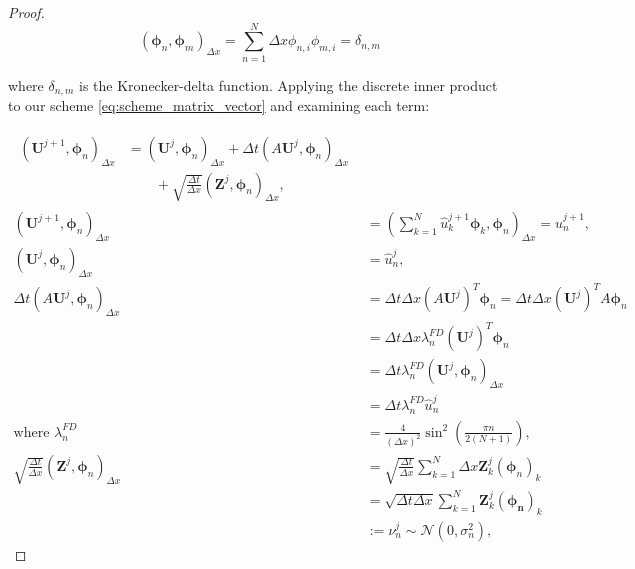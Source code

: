 \begin{proof}
\begin{equation*}
    (\boldsymbol{\phi}_n, \boldsymbol{\phi}_m)_{\Delta x} 
    = \sum_{n=1}^N \Delta x \phi_{n,i} \phi_{m,i} = \delta_{n,m}
\end{equation*}

where $\delta_{n,m}$ is the Kronecker-delta function.
Applying the discrete inner product to our 
scheme \eqref{eq:scheme_matrix_vector} and examining each term:

\begin{align}
    \begin{split}
        (\mathbf{U}^{j+1}, \boldsymbol{\phi}_n)_{\Delta x} &= 
        (\mathbf{U}^j, \boldsymbol{\phi}_n)_{\Delta x} + 
        \Delta t (A \mathbf{U}^j, \boldsymbol{\phi}_n)_{\Delta x}
        \label{eq:inner_product_var_res}
        \\
        &\qquad + \sqrt{\frac{\Delta t}{\Delta x}} 
        (\mathbf{Z}^j, \boldsymbol{\phi}_n)_{\Delta x},
    \end{split}\\
    (\mathbf{U}^{j+1}, \boldsymbol{\phi}_n)_{\Delta x} &=
    \left(\sum_{k=1}^{N} \hat{u}_k^{j+1} \boldsymbol{\phi}_k, 
    \boldsymbol{\phi}_n\right)_{\Delta x} = 
    \hat{u}_n^{j+1}, 
    \nonumber
    \\
    (\mathbf{U}^j, \boldsymbol{\phi}_n)_{\Delta x} &= \hat{u}_n^j, 
    \nonumber
    \\
    \Delta t (A \mathbf{U}^j, \boldsymbol{\phi}_n)_{\Delta x} &= 
    \Delta t \Delta x (A \mathbf{U}^j)^T \boldsymbol{\phi}_n = 
    \Delta t \Delta x (\mathbf{U}^j)^T A \boldsymbol{\phi}_n
    \label{eq:eigenval_1}\\
    &= \Delta t \Delta x \lambda_n^{FD}(\mathbf{U}^j)^T \boldsymbol{\phi}_n 
    \nonumber
    \\
    &= \Delta t \lambda_n^{FD} (\mathbf{U}^j, \boldsymbol{\phi}_n)_{\Delta x}
    \nonumber
    \\
    &= \Delta t \lambda_n^{FD} \hat{u}_n^j
     \label{eq:eigenval_2}\\
     \text{where }\lambda_n^{FD}&= \frac{4}{(\Delta x)^2} 
     \sin^2(\frac{\pi n}{2(N+1)}),
     \nonumber
     \\
    \sqrt{\frac{\Delta t}{\Delta x}}
    (\mathbf{Z}^j, \boldsymbol{\phi}_n)_{\Delta x} &= 
    \sqrt{\frac{\Delta t}{\Delta x}} \sum_{k=1}^N
    \Delta x \mathbf{Z}_k^j(\boldsymbol{\phi}_n)_k 
    \nonumber
    \\
    &= 
    \sqrt{\Delta t \Delta x} \sum_{k=1}^N \mathbf{Z}_k^j
    (\boldsymbol{\phi_n})_k 
    \nonumber
    \\
    &:= \nu_n^j 
    \sim \mathcal{N}(0, \sigma_n^2),
    \label{eq:sum_of_norm_variables}
\end{align}


\end{proof}
